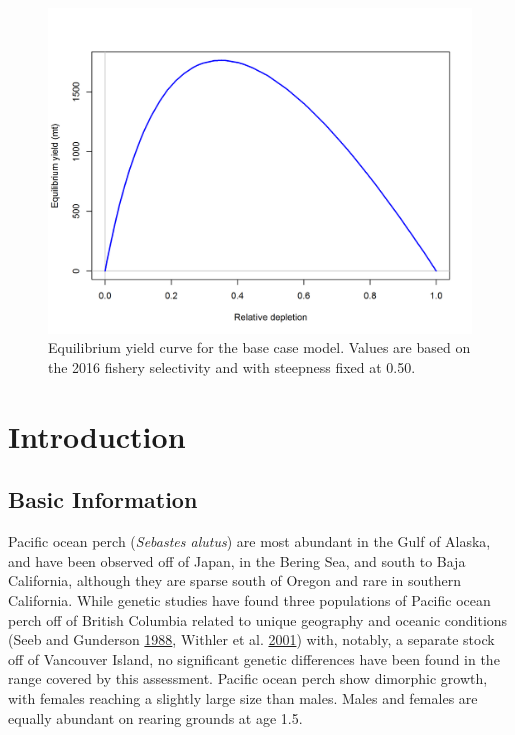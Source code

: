 \documentclass[12pt,]{article}
\begin{document}
\FloatBarrier

\begin{figure}
\centering
\includegraphics{r4ss/plots_mod1/yield1_yield_curve.png}
\caption{Equilibrium yield curve for the base case model. Values are
based on the 2016 fishery selectivity and with steepness fixed at 0.50.
\label{fig:Yield_all}}
\end{figure}

\FloatBarrier

\newpage

\renewcommand{\thefigure}{\arabic{figure}}
\renewcommand{\thetable}{\arabic{table}}

\setcounter{figure}{0} \setcounter{table}{0}


\section{Introduction}\label{introduction}

\subsection{Basic Information}\label{basic-information}

Pacific ocean perch (\emph{Sebastes alutus}) are most abundant in the
Gulf of Alaska, and have been observed off of Japan, in the Bering Sea,
and south to Baja California, although they are sparse south of Oregon
and rare in southern California. While genetic studies have found three
populations of Pacific ocean perch off of British Columbia related to
unique geography and oceanic conditions (Seeb and Gunderson
\protect\hyperlink{ref-seeb_genetic_1988}{1988}, Withler et al.
\protect\hyperlink{ref-withler_co-existing_2001}{2001}) with, notably, a
separate stock off of Vancouver Island, no significant genetic
differences have been found in the range covered by this assessment.
Pacific ocean perch show dimorphic growth, with females reaching a
slightly large size than males. Males and females are equally abundant
on rearing grounds at age 1.5.
\end{document}

